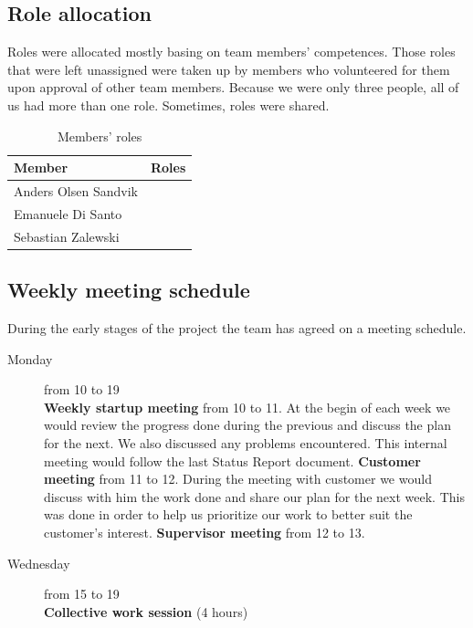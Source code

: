 \subsection{Role allocation}
Roles were allocated mostly basing on team members' competences.
Those roles that were left unassigned were taken up by members who volunteered for them upon approval of other team members.
Because we were only three people, all of us had more than one role. Sometimes, roles were shared.

\begin{table}
\begin{center}
\begin{tabular}{ | l | l | }
  \hline
  Member & Roles \\
  \hline\noalign{\smallskip}\noalign{\smallskip}\hline
  Anders Olsen Sandvik  &  \\
  Emanuele Di Santo     &  \\
  Sebastian Zalewski    &  \\
  \hline
\end{tabular}
\end{center}
\caption{Members' roles}
\label{table:roles}
\end{table}

\subsection{Weekly meeting schedule}
During the early stages of the project the team has agreed on a meeting schedule.

\begin{description}
\item[Monday] \hfill from 10 to 19 \\
\textbf{Weekly startup meeting} from 10 to 11.\newline
At the begin of each week we would review the progress done during the previous and discuss the plan for the next.
We also discussed any problems encountered.
This internal meeting would follow the last Status Report document.
\newline\textbf{Customer meeting} from 11 to 12.\newline
During the meeting with customer we would discuss with him the work done and share our plan for the next week.
This was done in order to help us prioritize our work to better suit the customer's interest.
\newline\textbf{Supervisor meeting} from 12 to 13.\newline
\item[Wednesday] \hfill from 15 to 19 \\
\textbf{Collective work session} (4 hours)
\end{description}

